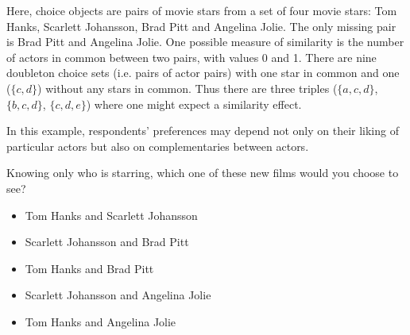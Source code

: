 Here, choice objects are pairs of movie stars from a set of four movie stars: Tom Hanks, Scarlett Johansson, Brad Pitt and Angelina Jolie.
The only missing pair is Brad Pitt and Angelina Jolie.
One possible measure of similarity is the number of actors in common between two pairs, with values 0 and 1.
There are nine doubleton choice sets (i.e. pairs of actor pairs) with one star in common and one ($\{c,d\}$) without any stars in common.
Thus there are three triples ($\{a,c,d\}$, $\{b,c,d\}$, $\{c,d,e\}$) where one might expect a similarity effect.

In this example, respondents' preferences may depend not only on their liking of particular actors but also on complementaries between actors.
{}
\begin{tcolorbox}
Knowing only who is starring, which one of these new films would you choose to see?

\begin{itemize}
	\setlength\itemsep{-5pt}
	\item Tom Hanks and Scarlett Johansson
	\item Scarlett Johansson and Brad Pitt
	\item Tom Hanks and Brad Pitt
	\item Scarlett Johansson and Angelina Jolie
	\item Tom Hanks and Angelina Jolie
\end{itemize}
\end{tcolorbox}
